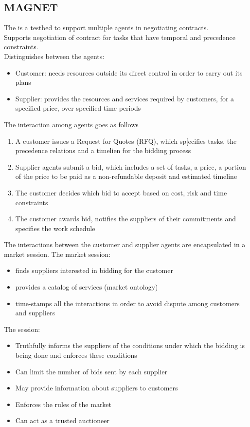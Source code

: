 \subsection{MAGNET}
The   is a testbed to support multiple agents in negotiating contracts.\\
Supports negotiation of contract for tasks that have temporal and precedence constraints.\\
Distinguishes between the agents:
\begin{itemize}
\item Customer: needs resources outside its direct control in order to carry out its plans
\item Supplier: provides the resources and services required by customers, for a specified price, over specified time periods
\end{itemize}

The interaction among agents goes as follows
\begin{enumerate}
\item A customer issues a Request for Quotes (RFQ), which sp[ecifies tasks, the precedence relations and a timelien for the bidding process
\item Supplier agents submit a bid, which includes a set of tasks, a price, a portion of the price to be paid as a non-refundable deposit and estimated timeline
\item The customer decides which bid to accept based on cost, risk and time constraints
\item The customer awards bid, notifies the suppliers of their commitments and specifies the work schedule
\end{enumerate}
The interactions between the customer and supplier agents are encapsulated in a market session. The market session:
\begin{itemize}
\item finds suppliers interested in bidding for the customer
\item provides a catalog of services (market ontology)
\item time-stamps all the interactions in order to avoid dispute among customers and suppliers
\end{itemize}

The session:
\begin{itemize}
\item Truthfully informs the suppliers of the conditions under which the bidding is being done and enforces these conditions
\item Can limit the number of bids sent by each supplier
\item May provide information about suppliers to customers
\item Enforces the rules of the market
\item Can act as a trusted auctioneer
\end{itemize}

